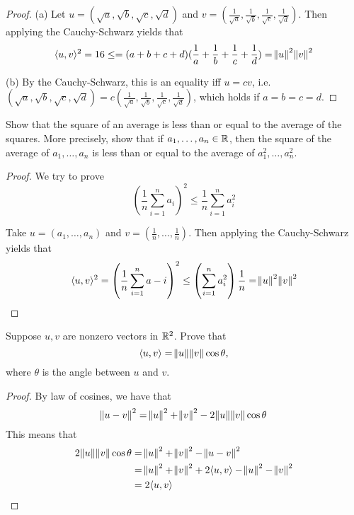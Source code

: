 \documentclass{extarticle}
\begin{document}
\begin{proof}
(a) Let \(u = (\sqrt{a},\sqrt{b},\sqrt{c},\sqrt{d})\) and \(v = 
(\frac{1}{\sqrt{a}}, \frac{1}{\sqrt{b}}, \frac{1}{\sqrt{c}}, \frac{1}{\sqrt{d}})\). Then applying the 
Cauchy-Schwarz yields that 
\begin{align*}
    \langle u,v \rangle^2 = 16 \leq = (a+b+c+d)(\frac{1}{a}+\frac{1}{b}+\frac{1}{c}+\frac{1}{d})= \norm{u}^2 \norm{v}^2
\end{align*}

(b) By the Cauchy-Schwarz, this is an equality iff \(u = cv\), i.e. \((\sqrt{a}, \sqrt{b}, \sqrt{c}, \sqrt{d}) 
= c (\frac{1}{\sqrt{a}}, \frac{1}{\sqrt{b}}, \frac{1}{\sqrt{c}}, \frac{1}{\sqrt{d}})\), which holds 
if \(a=b=c=d\).
\end{proof}

\begin{problem}{13}
    Show that the square of an average is less than or equal to the average of the squares. More 
    precisely, show that if \(a_1, \ldots, a_n \in \mathbb{R}\), then the square of the average of 
    \(a_1, \ldots, a_n\) is less than or equal to the average of \(a_1^2, \ldots, a_n^2\).
\end{problem}

\begin{proof}
We try to prove 
\[\left(\frac{1}{n} \sum_{i=1}^{n} a_i \right)^2 \leq \frac{1}{n} \sum_{i=1}^{n}a_i^2\]

Take \(u = (a_1, \ldots, a_n)\) and \(v = (\frac{1}{n}, \ldots, \frac{1}{n})\). Then applying the Cauchy-Schwarz yields
that 
\begin{align*}
    \langle u,v \rangle^2 
    = \left(\frac{1}{n} \sum_{i=1}^{n} a-i \right)^2 
    \leq \left(\sum_{i=1}^{n} a_i^2 \right)\frac{1}{n} = \norm{u}^2 \norm{v}^2 
\end{align*}
\end{proof}

\begin{problem}{15}
    Suppose \(u, v\) are nonzero vectors in \(\mathbb{R}^2\). Prove that 
    \[\langle u,v \rangle = \norm{u} \norm{v} \cos \theta ,\]
    where \(\theta\) is the angle between \(u\) and \(v\).
\end{problem}

\begin{proof}
By law of cosines, we have that 
\[\norm{u - v}^2 = \norm{u}^2 + \norm{v}^2 - 2 \norm{u}\norm{v}\cos \theta\]
This means that 
\begin{align*}
    2 \norm{u} \norm{v}\cos \theta 
    &= \norm{u}^2 + \norm{v}^2 - \norm{u - v}^2 \\ 
    &= \norm{u}^2 + \norm{v}^2 + 2 \langle u,v \rangle - \norm{u}^2 - \norm{v}^2 \\ 
    &= 2 \langle u,v \rangle
\end{align*}
\end{proof}
\end{document}
